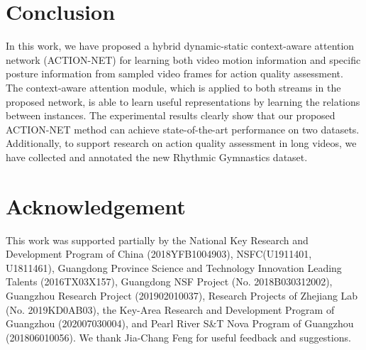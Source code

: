 \documentclass[sigconf]{acmart}
\begin{document}
\section{Conclusion}

In this work, we have proposed a hybrid dynamic-static context-aware attention network (ACTION-NET) for learning both video motion information and specific posture information from sampled video frames for action quality assessment. The context-aware attention module, which is applied to both streams in the proposed network, is able to learn useful representations by learning the relations between instances. 
The experimental results clearly show that our proposed ACTION-NET method can achieve state-of-the-art performance on two datasets.
Additionally, to support research on action quality assessment in long videos, we have collected and annotated the new Rhythmic Gymnastics dataset.

\vspace{-0.1cm}

\section{Acknowledgement}

This work was supported partially by the National Key Research and Development Program of China (2018YFB1004903), NSFC(U1911401, U1811461), Guangdong Province Science and Technology Innovation Leading Talents (2016TX03X157), Guangdong NSF Project (No. 2018B030312002), Guangzhou Research Project (201902010037), Research Projects of Zhejiang Lab (No. 2019KD0AB03), the Key-Area Research and Development Program of Guangzhou (202007030004), and Pearl River S\&T Nova Program of Guangzhou (201806010056).
We thank Jia-Chang Feng for useful feedback and suggestions.




\end{document}
